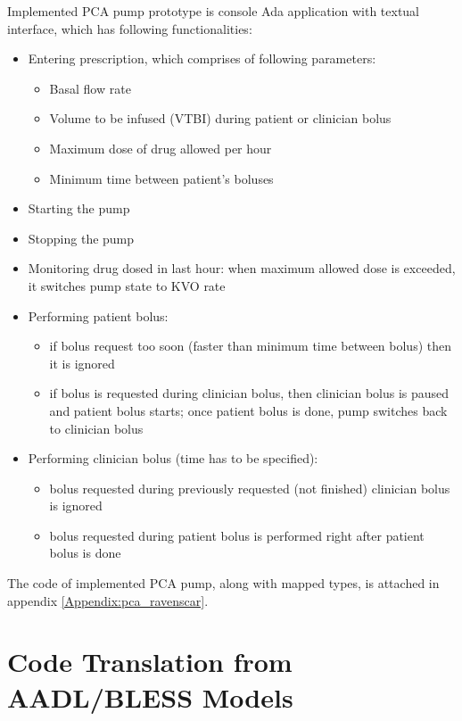 Implemented PCA pump prototype is console Ada application with textual interface, which has following functionalities:
\begin{itemize}
	\item Entering prescription, which comprises of following parameters:
		\begin{itemize}
			\item Basal flow rate
			\item Volume to be infused (VTBI) during patient or clinician bolus
			\item Maximum dose of drug allowed per hour
			\item Minimum time between patient's boluses
		\end{itemize}
	\item Starting the pump
	\item Stopping the pump
	\item Monitoring drug dosed in last hour: when maximum allowed dose is exceeded, it switches pump state to KVO rate
	\item Performing patient bolus:
		\begin{itemize}
			\item if bolus request too soon (faster than minimum time between bolus) then it is ignored
			\item if bolus is requested during clinician bolus, then clinician bolus is paused and patient bolus starts; once patient bolus is done, pump switches back to clinician bolus
		\end{itemize}
	\item Performing clinician bolus (time has to be specified):
		\begin{itemize}
			\item bolus requested during previously requested (not finished) clinician bolus is ignored
			\item bolus requested during patient bolus is performed right after patient bolus is done
		\end{itemize}
\end{itemize}

The code of implemented PCA pump, along with mapped types, is attached in appendix \ref{Appendix:pca_ravenscar}.



\section{Code Translation from AADL/BLESS Models}
\label{pcapumpimpl:codegen}

